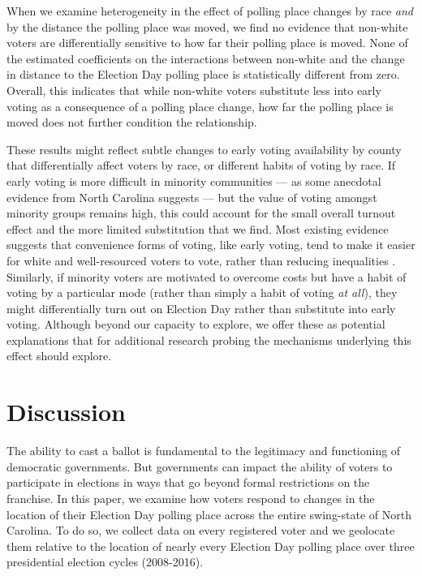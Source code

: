 \documentclass{cup_PSRM}
\begin{document}
When we examine heterogeneity in the effect of polling place changes by race \emph{and} by the distance the polling place was moved, we find no evidence that non-white voters are differentially sensitive to how far their polling place is moved.  None of the estimated coefficients on the interactions between non-white and the change in distance to the Election Day polling place is statistically different from zero.   Overall, this indicates that while non-white voters substitute less into early voting as a consequence of a polling place change, how far the polling place is moved does not further condition the relationship.

These results might reflect subtle changes to early voting availability by county that differentially affect voters by race, or different habits of voting by race.  If early voting is more difficult in minority communities --- as some anecdotal evidence from North Carolina suggests --- but the value of voting amongst minority groups remains high, this could account for the small overall turnout effect and the more limited substitution that we find.  Most existing evidence suggests that convenience forms of voting, like early voting, tend to make it easier for white and well-resourced voters to vote, rather than reducing inequalities \citep{karp2000going,berinksy2005reform,gronke2008early}.  Similarly, if minority voters are motivated to overcome costs but have a habit of voting by a particular mode (rather than simply a habit of voting \emph{at all}), they might differentially turn out on Election Day rather than substitute into early voting.  Although beyond our capacity to explore, we offer these as potential explanations that for additional research probing the mechanisms underlying this effect should explore.


\section{Discussion}\label{section_discussion}

\noindent The ability to cast a ballot is fundamental to the legitimacy and functioning of democratic governments. But governments can impact the ability of voters to participate in elections in ways that go beyond formal restrictions on the franchise. In this paper, we examine how voters respond to changes in the location of their Election Day polling place across the entire swing-state of North Carolina. To do so, we collect data on every registered voter and we geolocate them relative to the location of nearly every Election Day polling place over three presidential election cycles (2008-2016).
\end{document}

